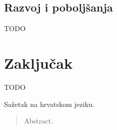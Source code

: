 \documentclass[times, utf8, zavrsni]{fer}
\begin{document}
\section{Razvoj i poboljšanja}

TODO

\chapter{Zaključak}
TODO




\begin{sazetak}
Sažetak na hrvatskom jeziku.

\end{sazetak}

\begin{abstract}
Abstract.

\end{abstract}
\end{document}
